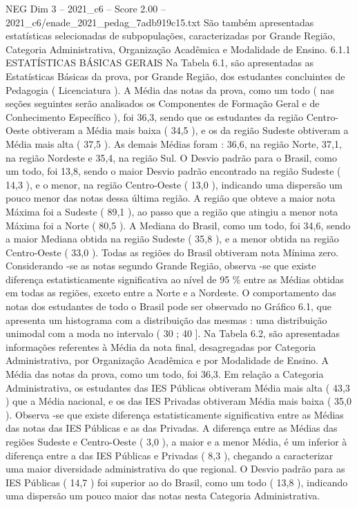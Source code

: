 \begin{textsample}{NEG Dim 3 – 2021\_c6 – Score 2.00 – 2021\_c6/enade\_2021\_pedag\_7adb919c15.txt}
São também apresentadas estatísticas selecionadas de subpopulações, caracterizadas por Grande Região, Categoria Administrativa, Organização Acadêmica e Modalidade de Ensino. 6.1.1 ESTATÍSTICAS BÁSICAS GERAIS Na Tabela 6.1, são apresentadas as Estatísticas Básicas da prova, por Grande Região, dos estudantes concluintes de Pedagogia ( Licenciatura ).
A Média das notas da prova, como um todo ( nas seções seguintes serão analisados os Componentes de Formação Geral e de Conhecimento Específico ), foi 36,3, sendo que os estudantes da região Centro-Oeste obtiveram a Média mais baixa ( 34,5 ), e os da região Sudeste obtiveram a Média mais alta ( 37,5 ).
As demais Médias foram : 36,6, na região Norte, 37,1, na região Nordeste e 35,4, na região Sul.
O Desvio padrão para o Brasil, como um todo, foi 13,8, sendo o maior Desvio padrão encontrado na região Sudeste ( 14,3 ), e o menor, na região Centro-Oeste ( 13,0 ), indicando uma dispersão um pouco menor das notas dessa última região.
A região que obteve a maior nota Máxima foi a Sudeste ( 89,1 ), ao passo que a região que atingiu a menor nota Máxima foi a Norte ( 80,5 ).
A Mediana do Brasil, como um todo, foi 34,6, sendo a maior Mediana obtida na região Sudeste ( 35,8 ), e a menor obtida na região Centro-Oeste ( 33,0 ).
Todas as regiões do Brasil obtiveram nota Mínima zero.
Considerando -se as notas segundo Grande Região, observa -se que existe diferença estatisticamente significativa ao nível de 95 \% entre as Médias obtidas em todas as regiões, exceto entre a Norte e a Nordeste.
O comportamento das notas dos estudantes de todo o Brasil pode ser observado no Gráfico 6.1, que apresenta um histograma com a distribuição das mesmas : uma distribuição unimodal com a moda no intervalo ( 30 ; 40 ].
Na Tabela 6.2, são apresentadas informações referentes à Média da nota final, desagregadas por Categoria Administrativa, por Organização Acadêmica e por Modalidade de Ensino.
A Média das notas da prova, como um todo, foi 36,3.
Em relação a Categoria Administrativa, os estudantes das IES Públicas obtiveram Média mais alta ( 43,3 ) que a Média nacional, e os das IES Privadas obtiveram Média mais baixa ( 35,0 ).
Observa -se que existe diferença estatisticamente significativa entre as Médias das notas das IES Públicas e as das Privadas.
A diferença entre as Médias das regiões Sudeste e Centro-Oeste ( 3,0 ), a maior e a menor Média, é um inferior à diferença entre a das IES Públicas e Privadas ( 8,3 ), chegando a caracterizar uma maior diversidade administrativa do que regional.
O Desvio padrão para as IES Públicas ( 14,7 ) foi superior ao do Brasil, como um todo ( 13,8 ), indicando uma dispersão um pouco maior das notas nesta Categoria Administrativa.

\end{textsample}
